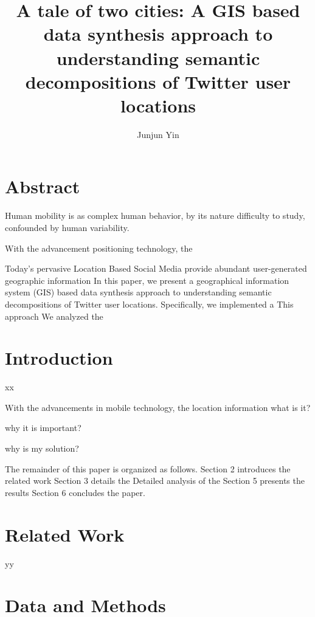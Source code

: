 \documentclass[a4paper, 11pt]{article}
\date{}
\begin{document}
\title{A tale of two cities: A GIS based data synthesis approach to understanding semantic decompositions of Twitter user locations}
\author[1~\thanks{Corresponding author: jyin@psu.edu}]{Junjun Yin}
\renewcommand\Authands{ and }
\maketitle

\section*{Abstract}
Human mobility is as complex human behavior, by its nature difficulty to study, confounded by human variability.

With the advancement positioning technology, the


Today's pervasive Location Based Social Media provide abundant user-generated geographic information
In this paper, we present a geographical information system (GIS) based data synthesis approach to understanding semantic decompositions of Twitter user locations.
Specifically, we implemented a
This approach 
We analyzed the 



\section{Introduction}

xx~\citep{yin2016exploring}

With the advancements in mobile technology, the location information 
what is it?

why it is important?

why is my solution?

The remainder of this paper is organized as follows. Section 2 introduces the related work 
Section 3 details the 
Detailed analysis of the
Section 5 presents the results
Section 6 concludes the paper.

\section{Related Work}
yy~\cite{yin2017depicting}


\section{Data and Methods}
\end{document}

